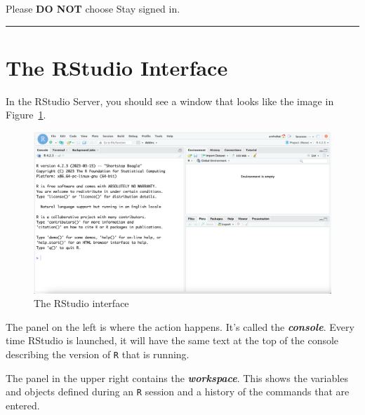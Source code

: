 \documentclass[
  letterpaper,
  DIV=11,
  numbers=noendperiod]{scrartcl}
\newenvironment{Shaded}{\begin{snugshade}}{\end{snugshade}}
\begin{document}
Please \textbf{DO NOT} choose Stay signed in.

\begin{Shaded}
\begin{Highlighting}[]

\end{Highlighting}
\end{Shaded}

\begin{center}\rule{0.5\linewidth}{0.5pt}\end{center}

\hypertarget{the-rstudio-interface}{%
\section{The RStudio Interface}\label{the-rstudio-interface}}

In the RStudio Server, you should see a window that looks like the image
in Figure~\ref{fig-rstudio}.

\begin{figure}

{\centering \includegraphics[width=9.83in,height=\textheight]{./figures/RStudio-Opening.png}

}

\caption{\label{fig-rstudio}The RStudio interface}

\end{figure}

The panel on the left is where the action happens. It's called the
\textbf{\emph{console}}. Every time RStudio is launched, it will have
the same text at the top of the console describing the version of
\texttt{R} that is running.

The panel in the upper right contains the \textbf{\emph{workspace}}.
This shows the variables and objects defined during an \texttt{R}
session and a history of the commands that are entered.
\end{document}
